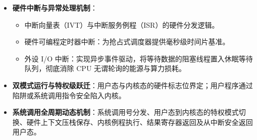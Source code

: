 \begin{itemize}
\begin{itemize}
        \item 硬件强制保护某些特权机器指令（如修改页表寄存器、停机指令、屏蔽中断）。
        \item 严格禁止用户态应用任意访问非法物理内存地址或直接读写磁盘块物理扇区。
        \item 对协处理器、GPU、密码学加速芯片及高速网络接口卡进行受控保护与资源复用。
    \end{itemize}
    \item \textbf{硬件中断与异常处理机制}：
    \begin{itemize}\setlength{\itemsep}{0pt}\setlength{\parskip}{0pt}
        \item 中断向量表（IVT）与中断服务例程（ISR）的硬件分发逻辑。
        \item 硬件可编程定时器中断：为抢占式调度器提供毫秒级时间片基准。
        \item 外设 I/O 中断：实现异步事件驱动，将等待数据的阻塞线程置入休眠等待队列，彻底消除 CPU 无谓轮询的能源与算力损耗。
    \end{itemize}
    \item \textbf{双模式运行与特权级跃迁}：用户态与内核态的硬件标志位界定；用户程序通过陷阱或系统调用指令安全陷入内核。
    \item \textbf{系统调用全周期动态机制}：系统调用号分发、用户态到内核态的特权模式切换、硬件上下文压栈保存、内核例程执行、结果寄存器返回及从中断安全返回用户态。
\end{itemize}

